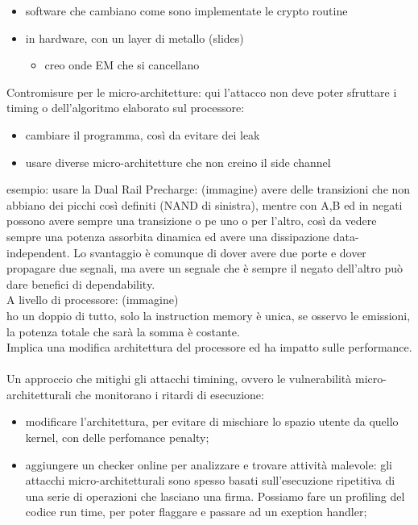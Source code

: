 \documentclass[oneside, 12pt]{extbook}
\begin{document}
\begin{itemize}
	\item software che cambiano come sono implementate le crypto routine
	\item in hardware, con un layer di metallo (slides)
	\begin{itemize}
		\item creo onde EM che si cancellano
	\end{itemize}
\end{itemize}
Contromisure per le micro-architetture: qui l'attacco non deve poter sfruttare i timing o dell'algoritmo elaborato sul processore:
\begin{itemize}
	\item cambiare il programma, così da evitare dei leak
	\item usare diverse micro-architetture che non creino il side channel
\end{itemize}
esempio: usare la Dual Rail Precharge: (immagine) avere delle transizioni che non abbiano dei picchi così definiti (NAND di sinistra), mentre con A,B ed in negati possono avere sempre una transizione o pe uno o per l'altro, così da vedere sempre una potenza assorbita dinamica ed avere una dissipazione data-independent. Lo svantaggio è comunque di dover avere due porte e dover propagare due segnali, ma avere un segnale che è sempre il negato dell'altro può dare benefici di dependability.\\A livello di processore: (immagine)\\ho un doppio di tutto, solo la instruction memory è unica, se osservo le emissioni, la potenza totale che sarà la somma è costante.\\Implica una modifica architettura del processore ed ha impatto sulle performance.\\\\Un approccio che mitighi gli attacchi timining, ovvero le vulnerabilità micro-architetturali che monitorano i ritardi di esecuzione:
\begin{itemize}
	\item modificare l'architettura, per evitare di mischiare lo spazio utente da quello kernel, con delle perfomance penalty;
	\item aggiungere un checker online per analizzare e trovare attività malevole: gli attacchi micro-architetturali sono spesso basati sull'esecuzione ripetitiva di una serie di operazioni che lasciano una firma. Possiamo fare un profiling del codice run time, per poter flaggare e passare ad un exeption handler;
\end{itemize}
\end{document}
